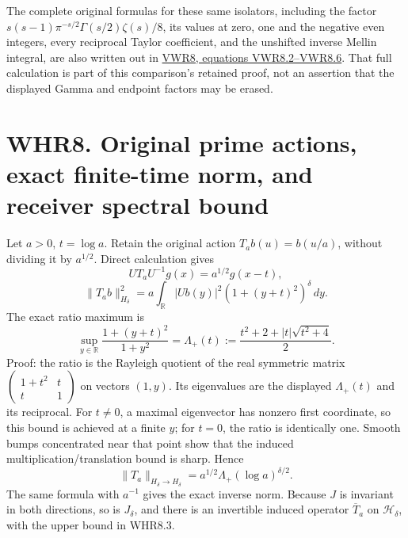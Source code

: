The complete original formulas for these same isolators, including the
factor \(s(s-1)\pi^{-s/2}\Gamma(s/2)\zeta(s)/8\), its values at zero,
one and the negative even integers, every reciprocal Taylor coefficient,
and the unshifted inverse Mellin integral, are also written out in
\href{https://github.com/KokunoYumeto/zeta-function-research-reader/blob/main/workbenches/splitzero-tandem/continuations/20260925-full-source-tensor-and-original-divisor/counterfactual/FULL_VERTICAL_WEIGHT_RETURN.md}{VWR8,
equations VWR8.2--VWR8.6}. That full calculation is part of this
comparison's retained proof, not an assertion that the displayed Gamma
and endpoint factors may be erased.

\section{WHR8. Original prime actions, exact finite-time norm, and
receiver spectral
bound}\label{whr8.-original-prime-actions-exact-finite-time-norm-and-receiver-spectral-bound}

Let \(a>0\), \(t=\log a\). Retain the original action
\(T_ab(u)=b(u/a)\), without dividing it by \(a^{1/2}\). Direct
calculation gives \[
 U T_a U^{-1}g(x)=a^{1/2}g(x-t),
\] \[
 \|T_ab\|_{H_\delta}^2
 =a\int_{\mathbb R}|Ub(y)|^2(1+(y+t)^2)^\delta\,dy.
 \tag{WHR8.1}
\] The exact ratio maximum is \[
 \sup_{y\in\mathbb R}\frac{1+(y+t)^2}{1+y^2}
 =\Lambda_+(t):=
 \frac{t^2+2+|t|\sqrt{t^2+4}}2.
 \tag{WHR8.2}
\] Proof: the ratio is the Rayleigh quotient of the real symmetric
matrix \(\left(\begin{smallmatrix}1+t^2&t\\t&1\end{smallmatrix}\right)\)
on vectors \((1,y)\). Its eigenvalues are the displayed \(\Lambda_+(t)\)
and its reciprocal. For \(t\ne0\), a maximal eigenvector has nonzero
first coordinate, so this bound is achieved at a finite \(y\); for
\(t=0\), the ratio is identically one. Smooth bumps concentrated near
that point show that the induced multiplication/translation bound is
sharp. Hence \[
 \boxed{\|T_a\|_{H_\delta\to H_\delta}
        =a^{1/2}\Lambda_+(\log a)^{\delta/2}.}
 \tag{WHR8.3}
\] The same formula with \(a^{-1}\) gives the exact inverse norm.
Because \(J\) is invariant in both directions, so is \(J_\delta\), and
there is an invertible induced operator \(\overline T_a\) on
\(\mathcal H_\delta\), with the upper bound in WHR8.3.

